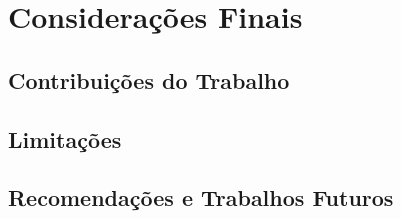 \chapter{Considerações Finais}
\label{cap:consideracoes-finais}



\section{Contribuições do Trabalho}
\label{sec:contribuicoes-do-trabalho}


\section{Limitações}
\label{sec:limitacoes}


\section{Recomendações e Trabalhos Futuros}
\label{sec:recomendacoes-e-trabalhos-futuros}

